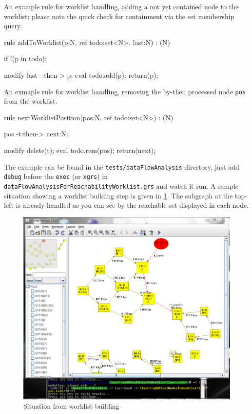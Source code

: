   \begin{example}
An example rule for worklist handling, adding a not yet contained node to the worklist; please note the quick check for containment via the set membership query.
    \begin{grgen}
rule addToWorklist(p:N, ref todo:set<N>, last:N) : (N)
{
  if{ !(p in todo); }

  modify {
    last -:then-> p;
    eval { todo.add(p); }
    return(p);
  }
}
    \end{grgen}
  \end{example}

  \begin{example}
An exmaple rule for worklist handling, removing the by-then processed node \texttt{pos} from the worklist.
    \begin{grgen}
rule nextWorklistPosition(pos:N, ref todo:set<N>) : (N)
{
  pos -t:then-> next:N;

  modify {
    delete(t);
    eval { todo.rem(pos); }
    return(next);
  }
}
    \end{grgen}
  \end{example}

The example can be found in the \texttt{tests/dataFlowAnalysis} directory, just add \texttt{debug} before the \texttt{exec} (or \texttt{xgrs}) in \texttt{dataFlowAnalysisForReachabilityWorklist.grs} and watch it run.
A sample situation showing a worklist building step is given in \ref{figworklist}.
The subgraph at the top-left is already handled as you can see by the reachable set displayed in each node.

\begin{figure}[htbp]
  \centering
  \includegraphics[width=\textwidth]{fig/Worklist}
  \caption{Situation from worklist building}
  \label{figworklist}
\end{figure}


